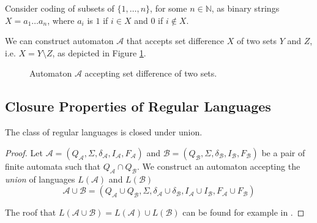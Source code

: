 	\noindent\hrulefill
	\begin{example}
	Consider coding of subsets of $\{1,\ldots,n\}$, for some $n \in \mathbb{N}$, as
	binary strings $X = a_1\ldots a_n$, where $a_i$ is $1$ if $i \in X$ and $0$ if
	$i \notin X$.
	
	We can construct automaton $\mathcal{A}$ that accepts set difference $X$ of two
	sets $Y$ and $Z$, i.e. $X = Y \setminus Z$, as depicted in Figure
	\ref{set-automaton}.
	
	\begin{figure}[h!]
	\begin{center}
	 \end{center}
	 \caption{Automaton $\mathcal{A}$ accepting set difference of two
	 sets.}\label{set-automaton}
	\end{figure}
	\end{example}
	
	\noindent\hrulefill
	
 \subsection{Closure Properties of Regular Languages}

\begin{theorem}
 The class of regular languages is closed under union.
\end{theorem}

\begin{proof}
Let $\mathcal{A} = (Q_\mathcal{A}, \Sigma, \delta_\mathcal{A}, I_\mathcal{A},
F_\mathcal{A})$ and $\mathcal{B} = (Q_\mathcal{B}, \Sigma, \delta_\mathcal{B},
I_\mathcal{B}, F_\mathcal{B})$ be a pair of finite automata such that
$Q_\mathcal{A} \cap Q_\mathcal{B}$. We construct an automaton accepting the
\emph{union} of languages $L(\mathcal{A})$ and $L(\mathcal{B})$  
 \begin{equation} \mathcal{A} \cup \mathcal{B} = (Q_\mathcal{A} \cup
 Q_\mathcal{B}, \Sigma, \delta_\mathcal{A} \cup \delta_\mathcal{B},
 I_\mathcal{A} \cup I_\mathcal{B}, F_\mathcal{A} \cup
F_\mathcal{B})
\end{equation}
	
The roof that $L(\mathcal{A} \cup \mathcal{B}) = L(\mathcal{A}) \cup
L(\mathcal{B})$ can be found for example in \cite{tin}.
\end{proof}

